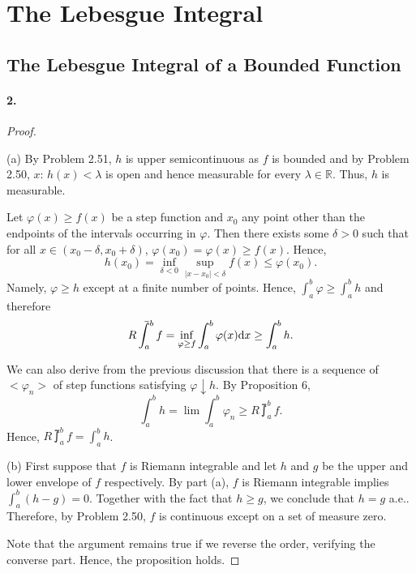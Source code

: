 \section{The Lebesgue Integral}
\setcounter{subsection}{1}

\subsection{The Lebesgue Integral of a Bounded Function}
  \paragraph{2.}
  \begin{proof}
    $\,$\par
    (a) By Problem 2.51, $h$ is upper semicontinuous as $f$ is bounded and by 
    Problem 2.50, ${x:\, h(x)<\lambda}$ is open and hence measurable for every
    $\lambda\in\mathbb{R}$. Thus, $h$ is measurable.\par
    Let $\varphi(x)\ge f(x)$ be a step function and $x_0$ any point other 
    than the endpoints of the intervals occurring in $\varphi$. Then there 
    exists some $\delta>0$ such that for all $x\in(x_0-\delta,x_0+\delta)$, 
    $\varphi(x_0) = \varphi(x) \ge f(x)$. Hence,
    \[
      h(x_0) = \inf_{\delta<0}\sup_{|x-x_0|<\delta}f(x) \le \varphi(x_0).
    \]
    Namely, $\varphi\ge h$ except at a finite number of points. Hence, $\int_a^b
    \varphi \ge \int_a^b h$ and therefore
    \[
      R\upint_a^b f = \inf_{\varphi\ge f}\int_a^b\varphi(x)\rd x \ge \int_a^b h.
    \]\par
    We can also derive from the previous discussion that there is a sequence of 
    $<\varphi_n>$ of step functions satisfying $\varphi \downarrow h$. By 
    Proposition 6,
    \[
      \int_a^b h = \lim\int_a^b\varphi_n \ge R\upint_a^b f.
    \]
    Hence, $R\upint_a^b f = \int_a^b h$.\par
    (b) First suppose that $f$ is Riemann integrable and let $h$ and $g$ be the 
    upper and lower envelope of $f$ respectively. By part (a), $f$ is Riemann 
    integrable implies $\int_a^b(h-g) = 0$. Together with the fact that $h\ge 
    g$, we conclude that $h=g$ a.e.. Therefore, by Problem 2.50, $f$ is 
    continuous except on a set of measure zero.\par
    Note that the argument remains true if we reverse the order, verifying the 
    converse part. Hence, the proposition holds.
  \end{proof}
